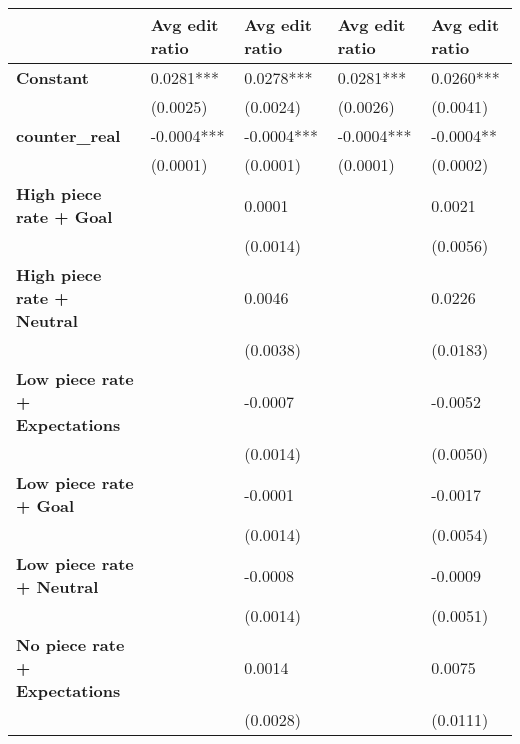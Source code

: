 \begin{tabular}{lllll}
\toprule
{} & Avg edit ratio & Avg edit ratio & Avg edit ratio & Avg edit ratio \\
\midrule
\textbf{Constant                                  } &      0.0281*** &      0.0278*** &      0.0281*** &      0.0260*** \\
                                           &       (0.0025) &       (0.0024) &       (0.0026) &       (0.0041) \\
\textbf{counter\_real                              } &     -0.0004*** &     -0.0004*** &     -0.0004*** &      -0.0004** \\
                                           &       (0.0001) &       (0.0001) &       (0.0001) &       (0.0002) \\
\textbf{High piece rate + Goal                    } &                &         0.0001 &                &         0.0021 \\
                                           &                &       (0.0014) &                &       (0.0056) \\
\textbf{High piece rate + Neutral                 } &                &         0.0046 &                &         0.0226 \\
                                           &                &       (0.0038) &                &       (0.0183) \\
\textbf{Low piece rate + Expectations             } &                &        -0.0007 &                &        -0.0052 \\
                                           &                &       (0.0014) &                &       (0.0050) \\
\textbf{Low piece rate + Goal                     } &                &        -0.0001 &                &        -0.0017 \\
                                           &                &       (0.0014) &                &       (0.0054) \\
\textbf{Low piece rate + Neutral                  } &                &        -0.0008 &                &        -0.0009 \\
                                           &                &       (0.0014) &                &       (0.0051) \\
\textbf{No piece rate + Expectations              } &                &         0.0014 &                &         0.0075 \\
                                           &                &       (0.0028) &                &       (0.0111) \\

\end{tabular}
